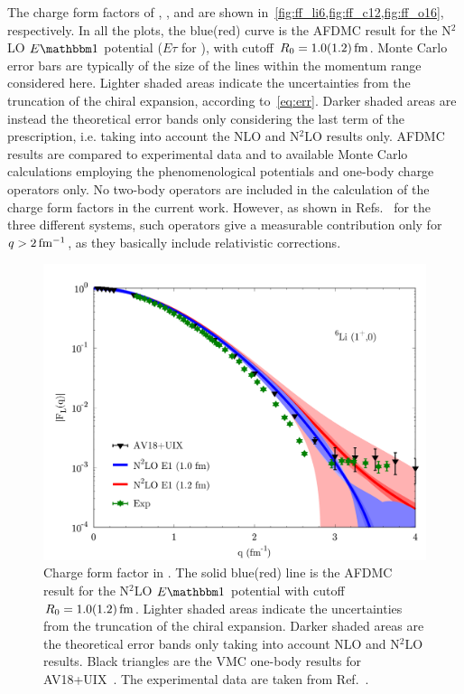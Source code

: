 \documentclass[aps,prc,twocolumn,superscriptaddress,floatfix]{revtex4-1}
\begin{document}
The charge form factors of , , and  are shown 
in~\cref{fig:ff_li6,fig:ff_c12,fig:ff_o16}, respectively. In all the plots, the blue(red) curve
is the AFDMC result for the N$^2$LO $E\mathbbm1$ potential ($E\tau$ for ), with cutoff $R_0=1.0(1.2)\,\rm fm$.
Monte Carlo error bars are typically of the size of the lines within the momentum 
range considered here. Lighter shaded areas indicate the uncertainties from 
the truncation of the chiral expansion, according to~\cref{eq:err}.
Darker shaded areas are instead the theoretical error bands only considering the last
term of the prescription, i.e. taking into account the NLO and N$^2$LO results only.
AFDMC results are compared to experimental data and to available Monte
Carlo calculations employing the phenomenological potentials and one-body charge operators only.
No two-body operators are included in the calculation of the charge form factors in the 
current work. However, as shown in Refs.~\cite{Wiringa:1998,Lovato:2013,Mihaila:2000} for the three
different systems, such operators give a measurable contribution only 
for $q>2\,\rm fm^{-1}$, as they basically include relativistic corrections.

\begin{figure}[htb]
\includegraphics[width=\linewidth]{ff_li6_e1.pdf}
\caption[]{Charge form factor in . The solid blue(red) line is the AFDMC result for the
N$^2$LO $E\mathbbm1$ potential with cutoff $R_0=1.0(1.2)\,\rm fm$.
Lighter shaded areas indicate the uncertainties from the truncation of the chiral expansion.
Darker shaded areas are the theoretical error bands only taking into account NLO and N$^2$LO results. 
Black triangles are the VMC one-body results for AV18+UIX~\cite{Wiringa:1998}.
The experimental data are taken from Ref.~\cite{Li:1971}.}
\label{fig:ff_li6}
\end{figure}
\end{document}
